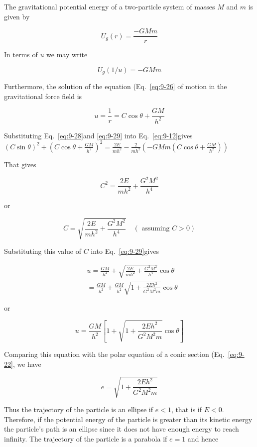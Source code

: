 \documentclass[10pt]{article}
\numberwithin{equation}{section}
\begin{document}
The gravitational potential energy of a two-particle system of masses $M$ and $m$ is given by

$$
U_{g}(r)=\frac{-G M m}{r}
$$

In terms of $u$ we may write


\begin{equation}
U_{g}(1 / u)=-G M m \label{eq:9-28}
\end{equation}


Furthermore, the solution of the equation (Eq.~\eqref{eq:9-26} of motion in the gravitational force field is


\begin{equation}
u=\frac{1}{r}=C \cos \theta+\frac{G M}{h^{2}} \label{eq:9-29}
\end{equation}


Substituting Eq.~\eqref{eq:9-28}and \eqref{eq:9-29} into Eq.~\eqref{eq:9-12}gives\\
$(C \sin \theta)^{2}+\left(C \cos \theta+\frac{G M}{h^{2}}\right)^{2}=\frac{2 E}{m h^{2}}-\frac{2}{m h^{2}}\left(-G M m\left(C \cos \theta+\frac{G M}{h^{2}}\right)\right)$

That gives

$$
C^{2}=\frac{2 E}{m h^{2}}+\frac{G^{2} M^{2}}{h^{4}}
$$

or

$$
C=\sqrt{\frac{2 E}{m h^{2}}+\frac{G^{2} M^{2}}{h^{4}}} \quad(\text { assuming } C>0)
$$

Substituting this value of $C$ into Eq.~\eqref{eq:9-29}gives

$$
\begin{aligned}
& u=\frac{G M}{h^{2}}+\sqrt{\frac{2 E}{m h^{2}}+\frac{G^{2} M^{2}}{h^{4}}} \cos \theta \\
& =\frac{G M}{h^{2}}+\frac{G M}{h^{2}} \sqrt{1+\frac{2 E h^{2}}{G^{2} M^{2} m}} \cos \theta
\end{aligned}
$$

or


\begin{equation}
u=\frac{G M}{h^{2}}\left[1+\sqrt{1+\frac{2 E h^{2}}{G^{2} M^{2} m}} \cos \theta\right] \label{eq:9-30}
\end{equation}


Comparing this equation with the polar equation of a conic section (Eq.~\eqref{eq:9-22}, we have

$$
e=\sqrt{1+\frac{2 E h^{2}}{G^{2} M^{2} m}}
$$

Thus the trajectory of the particle is an ellipse if $e<1$, that is if $E<0$. Therefore, if the potential energy of the particle is greater than its kinetic energy the particle's path is an ellipse since it does not have enough energy to reach infinity. The trajectory of the particle is a parabola if $e=1$ and hence
\end{document}
